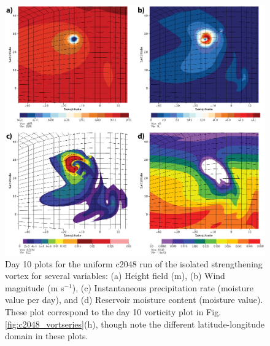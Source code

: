 \documentclass{ametsoc}
\begin{document}
\begin{figure}
    \centerline{%
    \noindent
    \includegraphics[width=\textwidth]{Figures/c2048_day10_plots-01.eps}}
   \caption{Day 10 plots for the uniform c2048 run of the isolated strengthening vortex for several variables: 
   (a) Height field (m), (b) Wind magnitude (m s$^{-1}$), (c) Instantaneous precipitation rate (moisture value per day), 
   and (d) Reservoir moisture content (moisture value).
   These plot correspond to the day 10 vorticity plot in Fig. \ref{fig:c2048_vortseries}(h), though
    note the different latitude-longitude domain in these plots. }%
    \label{fig:c2048_day10}
\end{figure}
\end{document}
